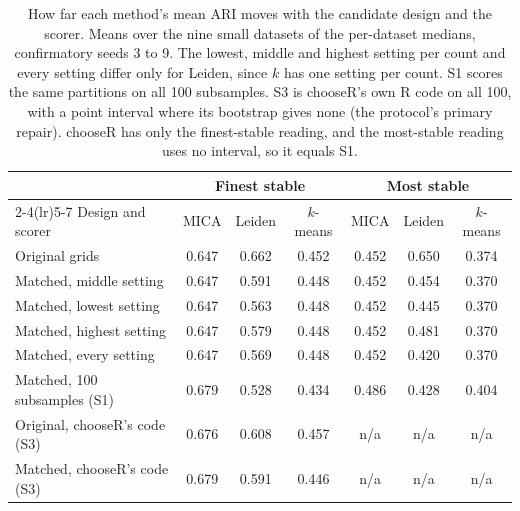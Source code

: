 \begin{table}[t]
\centering
\caption{How far each method's mean ARI moves with the candidate design and the scorer. Means over the nine small datasets of the per-dataset medians, confirmatory seeds 3 to 9. The lowest, middle and highest setting per count and every setting differ only for Leiden, since $k$ has one setting per count. S1 scores the same partitions on all 100 subsamples. S3 is chooseR's own R code on all 100, with a point interval where its bootstrap gives none (the protocol's primary repair). chooseR has only the finest-stable reading, and the most-stable reading uses no interval, so it equals S1.}
\label{tab:designs}
\footnotesize
\setlength{\tabcolsep}{4pt}
\begin{tabular}{lcccccc}
\toprule
 & \multicolumn{3}{c}{Finest stable} & \multicolumn{3}{c}{Most stable} \\
\cmidrule(lr){2-4}\cmidrule(lr){5-7}
Design and scorer & MICA & Leiden & $k$-means & MICA & Leiden & $k$-means \\
\midrule
Original grids & 0.647 & 0.662 & 0.452 & 0.452 & 0.650 & 0.374 \\
Matched, middle setting & 0.647 & 0.591 & 0.448 & 0.452 & 0.454 & 0.370 \\
Matched, lowest setting & 0.647 & 0.563 & 0.448 & 0.452 & 0.445 & 0.370 \\
Matched, highest setting & 0.647 & 0.579 & 0.448 & 0.452 & 0.481 & 0.370 \\
Matched, every setting & 0.647 & 0.569 & 0.448 & 0.452 & 0.420 & 0.370 \\
Matched, 100 subsamples (S1) & 0.679 & 0.528 & 0.434 & 0.486 & 0.428 & 0.404 \\
Original, chooseR's code (S3) & 0.676 & 0.608 & 0.457 & n/a & n/a & n/a \\
Matched, chooseR's code (S3) & 0.679 & 0.591 & 0.446 & n/a & n/a & n/a \\
\bottomrule
\end{tabular}
\end{table}
